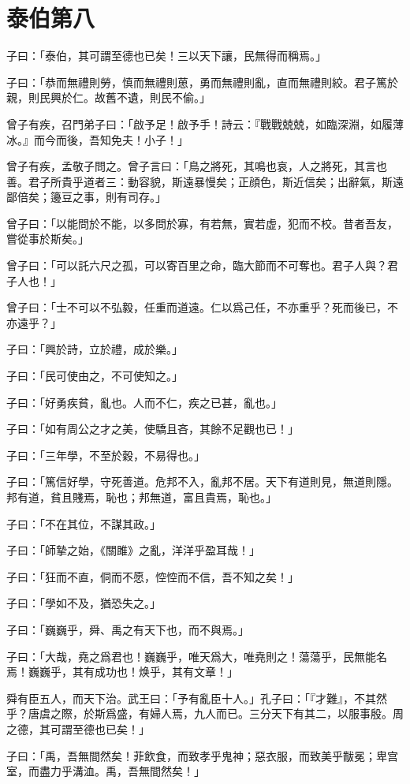 \section[泰伯第八]{泰伯第八}

子曰：「泰伯，其可謂至德也已矣！三以天下讓，民無得而稱焉。」

子曰：「恭而無禮則勞，慎而無禮則葸，勇而無禮則亂，直而無禮則絞。君子篤於親，則民興於仁。故舊不遺，則民不偷。」

曾子有疾，召門弟子曰：「啟予足！啟予手！詩云：『戰戰兢兢，如臨深淵，如履薄冰。』而今而後，吾知免夫！小子！」

曾子有疾，孟敬子問之。曾子言曰：「鳥之將死，其鳴也哀，人之將死，其言也善。君子所貴乎道者三：動容貌，斯遠暴慢矣；正顔色，斯近信矣；出辭氣，斯遠鄙倍矣；籩豆之事，則有司存。」

曾子曰：「以能問於不能，以多問於寡，有若無，實若虚，犯而不校。昔者吾友，嘗從事於斯矣。」

曾子曰：「可以託六尺之孤，可以寄百里之命，臨大節而不可奪也。君子人與？君子人也！」

曾子曰：「士不可以不弘毅，任重而道遠。仁以爲己任，不亦重乎？死而後已，不亦遠乎？」

子曰：「興於詩，立於禮，成於樂。」

子曰：「民可使由之，不可使知之。」

子曰：「好勇疾貧，亂也。人而不仁，疾之已甚，亂也。」

子曰：「如有周公之才之美，使驕且吝，其餘不足觀也已！」

子曰：「三年學，不至於穀，不易得也。」

子曰：「篤信好學，守死善道。危邦不入，亂邦不居。天下有道則見，無道則隱。邦有道，貧且賤焉，恥也；邦無道，富且貴焉，恥也。」

子曰：「不在其位，不謀其政。」

子曰：「師摯之始，《關雎》之亂，洋洋乎盈耳哉！」

子曰：「狂而不直，侗而不愿，悾悾而不信，吾不知之矣！」

子曰：「學如不及，猶恐失之。」

子曰：「巍巍乎，舜、禹之有天下也，而不與焉。」

子曰：「大哉，堯之爲君也！巍巍乎，唯天爲大，唯堯則之！蕩蕩乎，民無能名焉！巍巍乎，其有成功也！焕乎，其有文章！」

舜有臣五人，而天下治。武王曰：「予有亂臣十人。」孔子曰：「『才難』，不其然乎？唐虞之際，於斯爲盛，有婦人焉，九人而已。三分天下有其二，以服事殷。周之德，其可謂至德也已矣！」

子曰：「禹，吾無間然矣！菲飲食，而致孝乎鬼神；惡衣服，而致美乎黻冕；卑宫室，而盡力乎溝洫。禹，吾無間然矣！」
